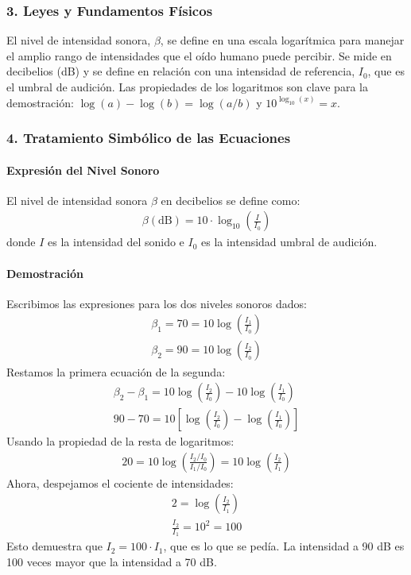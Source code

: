 \subsubsection*{3. Leyes y Fundamentos Físicos}
El nivel de intensidad sonora, $\beta$, se define en una escala logarítmica para manejar el amplio rango de intensidades que el oído humano puede percibir. Se mide en decibelios (dB) y se define en relación con una intensidad de referencia, $I_0$, que es el umbral de audición.
Las propiedades de los logaritmos son clave para la demostración: $\log(a) - \log(b) = \log(a/b)$ y $10^{\log_{10}(x)} = x$.

\subsubsection*{4. Tratamiento Simbólico de las Ecuaciones}
\paragraph*{Expresión del Nivel Sonoro}
El nivel de intensidad sonora $\beta$ en decibelios se define como:
\begin{gather}
    \beta (\text{dB}) = 10 \cdot \log_{10}\left(\frac{I}{I_0}\right)
\end{gather}
donde $I$ es la intensidad del sonido e $I_0$ es la intensidad umbral de audición.

\paragraph*{Demostración}
Escribimos las expresiones para los dos niveles sonoros dados:
\begin{gather}
    \beta_1 = 70 = 10 \log\left(\frac{I_1}{I_0}\right) \\
    \beta_2 = 90 = 10 \log\left(\frac{I_2}{I_0}\right)
\end{gather}
Restamos la primera ecuación de la segunda:
\begin{gather}
    \beta_2 - \beta_1 = 10 \log\left(\frac{I_2}{I_0}\right) - 10 \log\left(\frac{I_1}{I_0}\right) \\
    90 - 70 = 10 \left[ \log\left(\frac{I_2}{I_0}\right) - \log\left(\frac{I_1}{I_0}\right) \right]
\end{gather}
Usando la propiedad de la resta de logaritmos:
\begin{gather}
    20 = 10 \log\left(\frac{I_2/I_0}{I_1/I_0}\right) = 10 \log\left(\frac{I_2}{I_1}\right)
\end{gather}
Ahora, despejamos el cociente de intensidades:
\begin{gather}
    2 = \log\left(\frac{I_2}{I_1}\right) \\
    \frac{I_2}{I_1} = 10^2 = 100
\end{gather}
Esto demuestra que $I_2 = 100 \cdot I_1$, que es lo que se pedía. La intensidad a 90 dB es 100 veces mayor que la intensidad a 70 dB.

